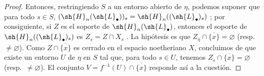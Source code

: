 \begin{proof}
Entonces, restringiendo $S$ a un entorno abierto de $\eta$, podemos suponer que para todo $s\in S$,
$(\sh{H}_n(\sh{L}_\bullet))_s=\sh{H}_n((\sh{L}_\bullet)_s)$ ; por consiguiente, si $Z$ es el soporte de $\sh{H}_n(\sh{L}_\bullet)$, entonces el soporte de $\sh{H}_n((\sh{L}_\bullet)_s)$ es $Z_s=Z\cap X_s$ .
La hipótesis es que $Z_\eta\cap\overline{\{x\}}=\varnothing$ (resp.~$\neq\varnothing$).
Como $Z\cap\overline{\{x\}}$ es cerrado en el espacio noetheriano $X$, concluimos de  que existe un entorno $U$ de $\eta$ en $S$ tal que, para todo $s\in U$, tenemos $Z_s\cap\overline{\{x\}}=\varnothing$ (resp.~$\neq\varnothing$).
El conjunto $V=f^{-1}(U)\cap\overline{\{x\}}$ responde así a la cuestión.
\end{proof}
